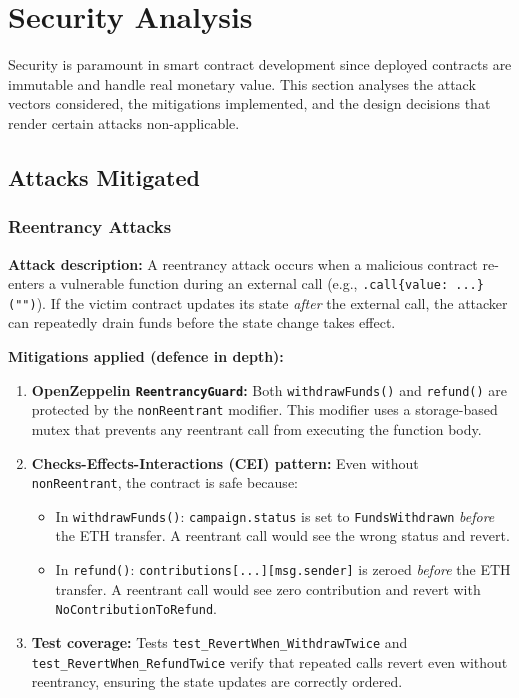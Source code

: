 \section{Security Analysis}
\label{sec:security}

Security is paramount in smart contract development since deployed contracts are immutable and handle real monetary value. This section analyses the attack vectors considered, the mitigations implemented, and the design decisions that render certain attacks non-applicable.

\subsection{Attacks Mitigated}

\subsubsection{Reentrancy Attacks}

\textbf{Attack description:} A reentrancy attack occurs when a malicious contract re-enters a vulnerable function during an external call (e.g., \texttt{.call\{value: ...\}("")}). If the victim contract updates its state \emph{after} the external call, the attacker can repeatedly drain funds before the state change takes effect.

\textbf{Mitigations applied (defence in depth):}

\begin{enumerate}[leftmargin=1.5em]
    \item \textbf{OpenZeppelin \texttt{ReentrancyGuard}:} Both \texttt{withdrawFunds()} and \texttt{refund()} are protected by the \texttt{nonReentrant} modifier. This modifier uses a storage-based mutex that prevents any reentrant call from executing the function body.
    
    \item \textbf{Checks-Effects-Interactions (CEI) pattern:} Even without \texttt{nonReentrant}, the contract is safe because:
    \begin{itemize}
        \item In \texttt{withdrawFunds()}: \texttt{campaign.status} is set to \texttt{FundsWithdrawn} \emph{before} the ETH transfer. A reentrant call would see the wrong status and revert.
        \item In \texttt{refund()}: \texttt{contributions[...][msg.sender]} is zeroed \emph{before} the ETH transfer. A reentrant call would see zero contribution and revert with \texttt{NoContributionToRefund}.
    \end{itemize}
    
    \item \textbf{Test coverage:} Tests \texttt{test\_RevertWhen\_WithdrawTwice} and \texttt{test\_RevertWhen\_RefundTwice} verify that repeated calls revert even without reentrancy, ensuring the state updates are correctly ordered.
\end{enumerate}

